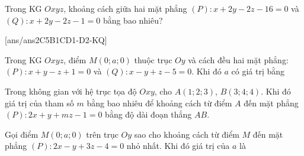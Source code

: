 \begin{ex}%
	Trong KG $Oxyz$, khoảng cách giữa hai mặt phẳng $(P)\colon x+2 y-2 z-16=0$ và $(Q)\colon x+2 y-2 z-1=0$ bằng bao nhiêu?
\end{ex}
\TNSA
{}[ans/ans2C5B1CD1-D2-KQ]
\begin{ex} %
	Trong KG $Oxyz$, điểm $M \left(0;a;0\right)$ thuộc trục $Oy$ và cách đều hai mặt phẳng: $\left(P\right) \colon x+y-z+1=0$ và $\left(Q\right) \colon x-y+z-5=0$. Khi đó $a$ có giá trị bằng
\end{ex}

\begin{ex} %
	Trong không gian với hệ trục tọa độ $Oxy$, cho $A \left(1;2;3\right)$, $B \left(3;4;4\right)$. Khi đó giá trị của tham số $m$ bằng bao nhiêu để khoảng cách từ điểm $A$ đến mặt phẳng $\left(P\right)\colon 2x + y + mz -1=0$ bằng độ dài đoạn thẳng $AB$.
\end{ex}

\begin{ex} %
	Gọi điểm $M \left(0;a;0\right)$ trên trục $Oy$ sao cho khoảng cách từ điểm $M$ đến mặt phẳng $\left(P\right) \colon 2x-y+3z-4=0$ nhỏ nhất. Khi đó giá trị của $a$ là
\end{ex}

